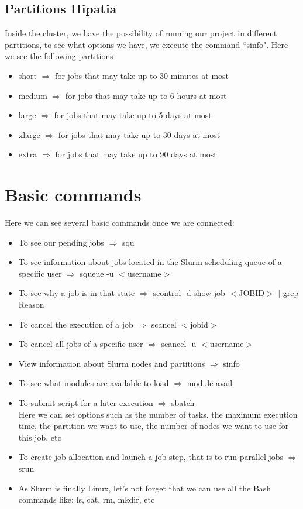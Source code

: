 \documentclass[a4paper]{article}
\begin{document}
		\subsection{Partitions Hipatia}
			Inside the cluster, we have the possibility of running our project in different partitions, to see what options we have, we execute the command ``sinfo". Here we see the following partitions\\ 
			\begin{itemize}
				\item short $\Rightarrow$ for jobs that may take up to 30 minutes at most
				\item medium $\Rightarrow$ for jobs that may take up to 6 hours at most
				\item large $\Rightarrow$ for jobs that may take up to 5 days at most
				\item xlarge $\Rightarrow$ for jobs that may take up to 30 days at most
				\item extra $\Rightarrow$ for jobs that may take up to 90 days at most
			\end{itemize} 
	\section{Basic commands}
		Here we can see several basic commands once we are connected:\\
		\begin{itemize}
			\item To see our pending jobs $\Rightarrow$ squ\\
			\item To see information about jobs located in the Slurm scheduling queue of a specific user $\Rightarrow$ squeue -u $<$username$>$\\
			\item To see why a job is in that state $\Rightarrow$ scontrol -d show job $<$JOBID$>$ $|$ grep Reason\\
			\item To cancel the execution of a job $\Rightarrow$ scancel $<$jobid$>$\\
			\item To cancel all jobs of a specific user $\Rightarrow$ scancel -u $<$username$>$\\
			\item View information about Slurm nodes and partitions $\Rightarrow$ sinfo\\
			\item To see what modules are available to load $\Rightarrow$ module avail
			\item To submit script for a later execution $\Rightarrow$ sbatch\\
				Here we can set options such as the number of tasks, the maximum execution time, the partition we want to use, the number of nodes we want to use for this job, etc
			\item To create job allocation and launch a job step, that is to run parallel jobs $\Rightarrow$ srun
			\item As Slurm is finally Linux, let's not forget that we can use all the Bash commands like: ls, cat, rm, mkdir, etc
		\end{itemize} 				
	
\end{document}
